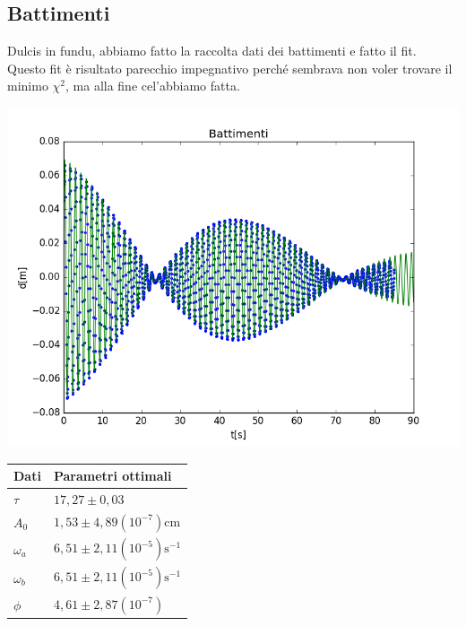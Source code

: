 \documentclass{exam}
\begin{document}
		\subsection {Battimenti}
			Dulcis in fundu, abbiamo fatto la raccolta dati dei battimenti e fatto il fit. Questo fit è risultato parecchio impegnativo perch\'e sembrava non voler trovare il minimo $\chi^2$, ma alla fine cel'abbiamo fatta.\\
			\begin{minipage}{0.5\textwidth}
				\includegraphics[width=\textwidth]{Battimenti}
				\end{minipage}
			\begin{minipage}{0.5\textwidth}
				\begin{tabular}{ll}
					\toprule
					Dati & Parametri ottimali \\
					\midrule
					$\tau$ & $17,27 \pm 0,03$ \\
					$A_{0}$ & $1,53 \pm 4,89(10^{-7})$cm\\
					$\omega_{a}$ & $6,51 \pm 2,11(10^{-5})\textrm{s}^{-1}$\\
					$\omega_{b}$ & $6,51 \pm 2,11(10^{-5})\textrm{s}^{-1}$\\			
					$\phi$ & $4,61 \pm 2,87(10^{-7})$\\
					\bottomrule
				\end{tabular}
			\end{minipage}
\end{document}
